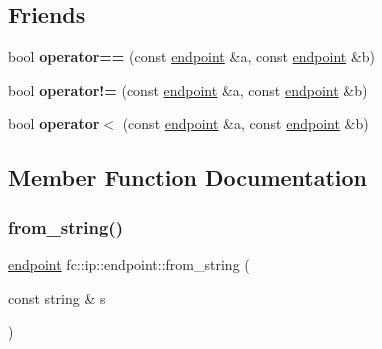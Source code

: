 \subsection*{Friends}
\begin{DoxyCompactItemize}
\item 
\mbox{\label{classfc_1_1ip_1_1endpoint_abbc398434e10da844dfb35060c472a25}} 
bool {\bfseries operator==} (const \mbox{\hyperlink{classfc_1_1ip_1_1endpoint}{endpoint}} \&a, const \mbox{\hyperlink{classfc_1_1ip_1_1endpoint}{endpoint}} \&b)
\item 
\mbox{\label{classfc_1_1ip_1_1endpoint_a0cdcb0047f3ae66889d3a8d2d01a1a9e}} 
bool {\bfseries operator!=} (const \mbox{\hyperlink{classfc_1_1ip_1_1endpoint}{endpoint}} \&a, const \mbox{\hyperlink{classfc_1_1ip_1_1endpoint}{endpoint}} \&b)
\item 
\mbox{\label{classfc_1_1ip_1_1endpoint_aa0defbdcb5d502ecbdfb035009e24f75}} 
bool {\bfseries operator$<$} (const \mbox{\hyperlink{classfc_1_1ip_1_1endpoint}{endpoint}} \&a, const \mbox{\hyperlink{classfc_1_1ip_1_1endpoint}{endpoint}} \&b)
\end{DoxyCompactItemize}


\subsection{Member Function Documentation}
\mbox{\label{classfc_1_1ip_1_1endpoint_a80c154405619b208c9d057d2c91958c9}} 
\subsubsection{\texorpdfstring{from\+\_\+string()}{from\_string()}}
{\footnotesize\ttfamily \mbox{\hyperlink{classfc_1_1ip_1_1endpoint}{endpoint}} fc\+::ip\+::endpoint\+::from\+\_\+string (\begin{DoxyParamCaption}\item[{const string \&}]{s }\end{DoxyParamCaption})\hspace{0.3cm}{\ttfamily [static]}}


